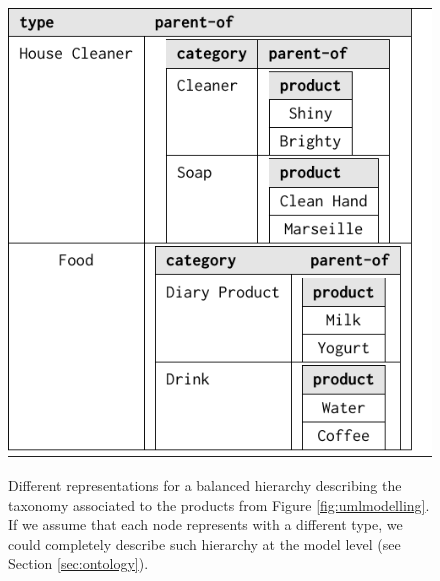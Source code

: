 \begin{figure}[htp]
\begin{minipage}[t]{0.7\textwidth}
\centering
	\includegraphics[scale=0.7]{fig/01dataint/02hiasnested}
	\label{fig:nhierarchy}
\end{minipage}

\caption{Different representations for a balanced hierarchy describing the taxonomy associated to the products from Figure \vref{fig:umlmodelling}. If we assume that each node represents with a different type, we could completely describe such hierarchy at the model level (see Section \ref{sec:ontology}).}
\end{figure}

